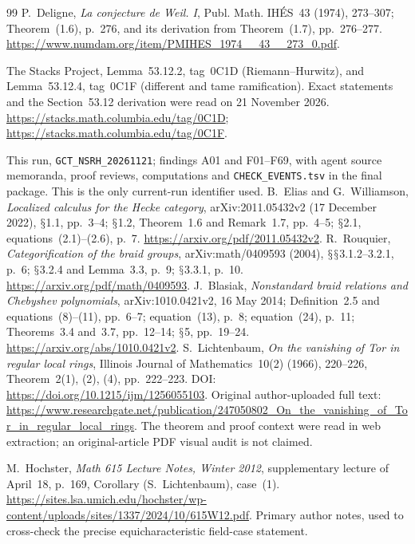 \documentclass[11pt,a4paper]{article}
\renewcommand{\S}{\ensuremath{\mathsection}}
\theoremstyle{named}\newtheorem{finding}{Finding}[section]
\theoremstyle{definition}\newtheorem{definition}[finding]{Definition}
\theoremstyle{remark}\newtheorem{remark}[finding]{Remark}
\begin{document}
\begin{thebibliography}{99}
 P.~Deligne, \emph{La conjecture de Weil. I},
Publ. Math. IH\'ES~43 (1974), 273--307; Theorem~(1.6), p.~276,
and its derivation from Theorem~(1.7), pp.~276--277.
\url{https://www.numdam.org/item/PMIHES_1974__43__273_0.pdf}.

 The Stacks Project, Lemma~53.12.2, tag~0C1D (Riemann--Hurwitz), and Lemma~53.12.4, tag~0C1F (different and tame ramification). Exact statements and the Section~53.12 derivation were read on 21 November 2026. \url{https://stacks.math.columbia.edu/tag/0C1D}; \url{https://stacks.math.columbia.edu/tag/0C1F}.

 This run, \texttt{GCT\_NSRH\_20261121}; findings A01 and F01--F69, with agent source memoranda, proof reviews, computations and \texttt{CHECK\_EVENTS.tsv} in the final package. This is the only current-run identifier used.
 B.~Elias and G.~Williamson,
\emph{Localized calculus for the Hecke category},
arXiv:2011.05432v2 (17 December 2022),
\S1.1, pp.~3--4; \S1.2, Theorem~1.6 and Remark~1.7,
pp.~4--5; \S2.1, equations~(2.1)--(2.6), p.~7.
\url{https://arxiv.org/pdf/2011.05432v2}.
 R.~Rouquier,
\emph{Categorification of the braid groups},
arXiv:math/0409593 (2004),
\S\S3.1.2--3.2.1, p.~6; \S3.2.4 and Lemma~3.3, p.~9;
\S3.3.1, p.~10.
\url{https://arxiv.org/pdf/math/0409593}.
 J.~Blasiak, \emph{Nonstandard braid relations and Chebyshev polynomials}, arXiv:1010.0421v2, 16 May 2014; Definition~2.5 and equations~(8)--(11), pp.~6--7; equation~(13), p.~8; equation~(24), p.~11; Theorems~3.4 and~3.7, pp.~12--14; \S5, pp.~19--24. \url{https://arxiv.org/abs/1010.0421v2}.
 S.~Lichtenbaum,
\emph{On the vanishing of Tor in regular local rings},
Illinois Journal of Mathematics~10(2) (1966), 220--226,
Theorem~2(1), (2), (4), pp.~222--223.
DOI: \url{https://doi.org/10.1215/ijm/1256055103}.
Original author-uploaded full text:
\url{https://www.researchgate.net/publication/247050802_On_the_vanishing_of_Tor_in_regular_local_rings}.
The theorem and proof context were read in web extraction;
an original-article PDF visual audit is not claimed.

 M.~Hochster,
\emph{Math 615 Lecture Notes, Winter 2012},
supplementary lecture of April~18, p.~169,
Corollary (S.~Lichtenbaum), case~(1).
\url{https://sites.lsa.umich.edu/hochster/wp-content/uploads/sites/1337/2024/10/615W12.pdf}.
Primary author notes, used to cross-check the precise
equicharacteristic field-case statement.


\end{thebibliography}
\end{document}
